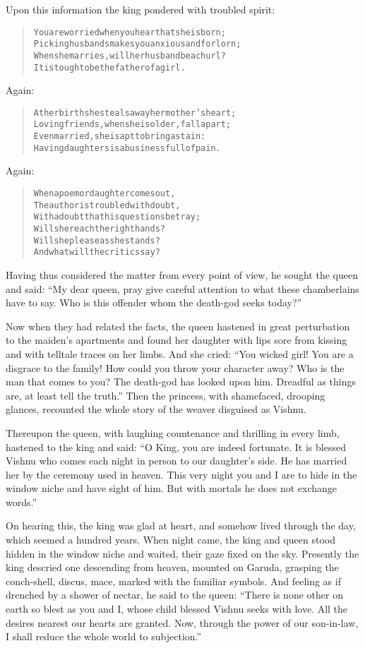 \documentclass[article, twoside, 14pt]{memoir}
\renewenvironment{verbatim}{%
\begin{quote}%
\vskip -10pt%
\begin{alltt}\normalfont\large}{\end{alltt}%
\end{quote}%
\vskip -10pt
} %
\begin{document}
Upon this information the king pondered with troubled spirit:

\begin{verbatim}
You are worried when you hear that she is born;
Picking husbands makes you anxious and forlorn;
When she marries, will her husband be a churl?
It is tough to be the father of a girl.
\end{verbatim}
Again:

\begin{verbatim}
At her birth she steals away her mother's heart;
Loving friends, when she is older, fall apart;
Even married, she is apt to bring a stain:
Having daughters is a business full of pain.
\end{verbatim}
Again:

\begin{verbatim}
When a poem or daughter comes out,
The author is troubled with doubt,
    With a doubt that his questions betray;
Will she reach the right hands?
Will she please as she stands?
    And what will the critics say?
\end{verbatim}
Having thus considered the matter from every point of view, he
sought the queen and said:
``My dear queen, pray give careful attention to what these chamberlains have to say. Who is this offender whom the death-god seeks today?''

Now when they had related the facts, the queen hastened in great
perturbation to the maiden's apartments and found her daughter with
lips sore from kissing and with telltale traces on her limbs. And
she cried:
``You wicked girl! You are a disgrace to the family! How could you throw your character away? Who is the man that comes to you? The death-god has looked upon him. Dreadful as things are, at least tell the truth.''
Then the princess, with shamefaced, drooping glances, recounted the
whole story of the weaver disguised as Vishnu.

Thereupon the queen, with laughing countenance and thrilling in
every limb, hastened to the king and said:
``O King, you are indeed fortunate. It is blessed Vishnu who comes each night in person to our daughter's side. He has married her by the ceremony used in heaven. This very night you and I are to hide in the window niche and have sight of him. But with mortals he does not exchange words.''

On hearing this, the king was glad at heart, and somehow lived
through the day, which seemed a hundred years. When night came, the
king and queen stood hidden in the window niche and waited, their
gaze fixed on the sky. Presently the king descried one descending
from heaven, mounted on Garuda, grasping the conch-shell, discus,
mace, marked with the familiar symbols. And feeling as if drenched
by a shower of nectar, he said to the queen:
``There is none other on earth so blest as you and I, whose child blessed Vishnu seeks with love. All the desires nearest our hearts are granted. Now, through the power of our son-in-law, I shall reduce the whole world to subjection.''
\end{document}

